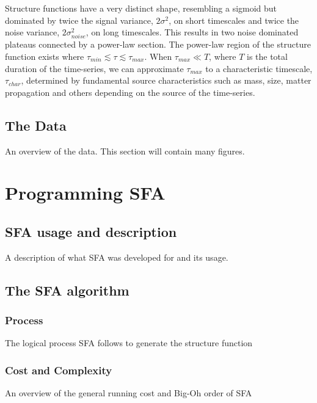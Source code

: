 \documentclass[12pt, oneside]{smuthesis}
\begin{document}
Structure functions have a very distinct shape, resembling a sigmoid but dominated by twice the signal variance, $2\sigma^{2}$, on short timescales and twice the noise variance, $2\sigma_{noise}^{2}$, on long timescales. This results in two noise dominated plateaus connected by a power-law section. The power-law region of the structure function exists where $\tau_{min}\lesssim\tau\lesssim\tau_{max}$. When $\tau_{max}\ll T$, where $T$ is the total duration of the time-series, we can approximate $\tau_{max}$ to a characteristic timescale, $\tau_{char}$, determined by fundamental source characteristics such as mass, size, matter propagation and others depending on the source of the time-series.

\section{\sc The Data} \label{theData}

An overview of the data. This section will contain many figures.

\chapter{\sc Programming SFA} \label{programmingSFA}

\section{\sc SFA usage and description} \label{usageDescription}

A description of what SFA was developed for and its usage.

\section{\sc The SFA algorithm} \label{algorithm}

\subsection{\sc Process}

The logical process SFA follows to generate the structure function

\subsection{\sc Cost and Complexity} \label{costComplexity}

An overview of the general running cost and Big-Oh order of SFA
\end{document}
